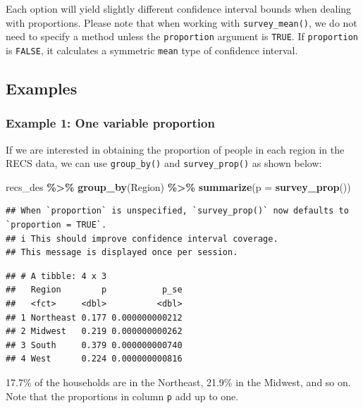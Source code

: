 \documentclass[
]{krantz}
\makeatletter
\newenvironment{Shaded}{\begin{snugshade}}{\end{snugshade}}
\newcommand{\AttributeTok}[1]{\textcolor[rgb]{0.27,0.27,0.27}{#1}}
\newcommand{\FunctionTok}[1]{\textcolor[rgb]{0.27,0.27,0.27}{\textbf{#1}}}
\newcommand{\NormalTok}[1]{#1}
\newcommand{\SpecialCharTok}[1]{\textcolor[rgb]{0.43,0.43,0.43}{\textbf{#1}}}
\newenvironment{kframe}{%
\medskip{}
\setlength{\fboxsep}{.8em}
 \def\at@end@of@kframe{}%
 \ifinner\ifhmode%
  \def\at@end@of@kframe{\end{minipage}}%
  \begin{minipage}{\columnwidth}%
 \fi\fi%
 \def\FrameCommand##1{\hskip\@totalleftmargin \hskip-\fboxsep
 \colorbox{shadecolor}{##1}\hskip-\fboxsep
     \hskip-\linewidth \hskip-\@totalleftmargin \hskip\columnwidth}%
 \MakeFramed {\advance\hsize-\width
   \@totalleftmargin\z@ \linewidth\hsize
   \@setminipage}}%
 {\par\unskip\endMakeFramed%
 \at@end@of@kframe}
\renewenvironment{Shaded}{\begin{kframe}}{\end{kframe}}
\makeatother
\begin{document}
Each option will yield slightly different confidence interval bounds when dealing with proportions. Please note that when working with \texttt{survey\_mean()}, we do not need to specify a method unless the \texttt{proportion} argument is \texttt{TRUE}. If \texttt{proportion} is \texttt{FALSE}, it calculates a symmetric \texttt{mean} type of confidence interval.

\hypertarget{examples-2}{%
\subsection{Examples}\label{examples-2}}

\hypertarget{example-1-one-variable-proportion}{%
\subsubsection*{Example 1: One variable proportion}\label{example-1-one-variable-proportion}}


If we are interested in obtaining the proportion of people in each region in the RECS data, we can use \texttt{group\_by()} and \texttt{survey\_prop()} as shown below:

\begin{Shaded}
\begin{Highlighting}[]
\NormalTok{recs\_des }\SpecialCharTok{\%\textgreater{}\%}
  \FunctionTok{group\_by}\NormalTok{(Region) }\SpecialCharTok{\%\textgreater{}\%}
  \FunctionTok{summarize}\NormalTok{(}\AttributeTok{p =} \FunctionTok{survey\_prop}\NormalTok{())}
\end{Highlighting}
\end{Shaded}

\begin{verbatim}
## When `proportion` is unspecified, `survey_prop()` now defaults to `proportion = TRUE`.
## i This should improve confidence interval coverage.
## This message is displayed once per session.
\end{verbatim}

\begin{verbatim}
## # A tibble: 4 x 3
##   Region        p           p_se
##   <fct>     <dbl>          <dbl>
## 1 Northeast 0.177 0.000000000212
## 2 Midwest   0.219 0.000000000262
## 3 South     0.379 0.000000000740
## 4 West      0.224 0.000000000816
\end{verbatim}

17.7\% of the households are in the Northeast, 21.9\% in the Midwest, and so on. Note that the proportions in column \texttt{p} add up to one.
\end{document}
